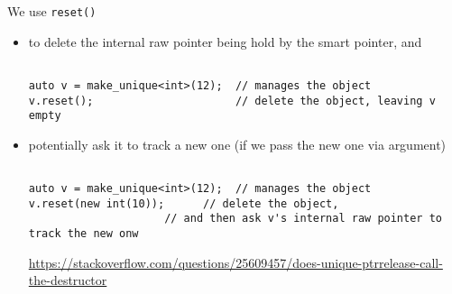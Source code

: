 We use \verb!reset()! 
\begin{itemize}
  \item to delete the internal raw pointer being hold by the smart pointer, and 
  
\begin{lstlisting}

auto v = make_unique<int>(12);  // manages the object
v.reset();                      // delete the object, leaving v empty

\end{lstlisting}


  \item potentially ask it to track a new one (if we pass the new one via argument)

\begin{lstlisting}

auto v = make_unique<int>(12);  // manages the object
v.reset(new int(10));      // delete the object, 
                     // and then ask v's internal raw pointer to track the new onw 
\end{lstlisting}

\url{https://stackoverflow.com/questions/25609457/does-unique-ptrrelease-call-the-destructor}

\end{itemize}
